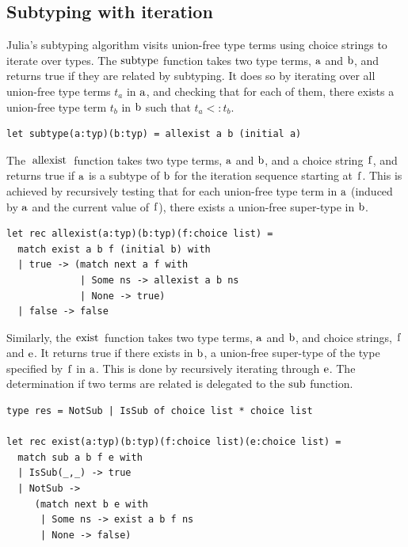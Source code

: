 \documentclass[a4paper,english]{lipics-v2019}
\renewcommand{\c}[1]{\ensuremath{\text{\lstinline{#1}}}\xspace}
\begin{document}
\subsection{Subtyping with iteration}

Julia's subtyping algorithm visits union-free type terms using choice
strings to iterate over types. The \c{subtype} function takes two type
terms, \c a and \c b, and returns true if they are related by
subtyping. It does so by iterating over all union-free type terms $t_a$ in \c a,
and checking that for each of them, there exists a union-free type term $t_b$ in
\c b such that $t_a <: t_b$.

\begin{lstlisting}
let subtype(a:typ)(b:typ) = allexist a b (initial a)
\end{lstlisting}

\noindent
The \c{allexist} function takes two type terms, \c a and \c b, and a choice
string \c f, and returns true if \c a is a subtype of \c b for the iteration
sequence starting at \c f. This is achieved by recursively testing that for
each union-free type term in \c a (induced by \c a and the current value of
\c f), there exists a union-free super-type in \c b.


\begin{lstlisting}
let rec allexist(a:typ)(b:typ)(f:choice list) =
  match exist a b f (initial b) with 
  | true -> (match next a f with
             | Some ns -> allexist a b ns 
             | None -> true) 
  | false -> false
\end{lstlisting}

\noindent
Similarly, the \c{exist} function takes two type terms, \c a and \c b, and
choice strings, \c f and \c e. It returns true if there exists in \c b, a
union-free super-type of the type specified by \c f in \c a. This is done by
recursively iterating through \c e. The determination if two terms are
related is delegated to the \c{sub} function.

\begin{lstlisting}
type res = NotSub | IsSub of choice list * choice list

let rec exist(a:typ)(b:typ)(f:choice list)(e:choice list) =
  match sub a b f e with 
  | IsSub(_,_) -> true 
  | NotSub -> 
     (match next b e with
      | Some ns -> exist a b f ns 
      | None -> false) 
\end{lstlisting}
\end{document}
